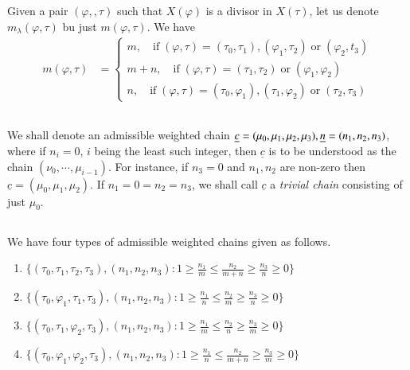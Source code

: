 Given a pair $(\varphi,,\tau)$ such that $X(\varphi)$ is a divisor in $X(\tau)$, let us denote $m_{\lambda}(\varphi, \tau)$ bu just $m(\varphi, \tau)$. We have
\begin{align*}
m(\varphi, \tau) &=
\begin{cases}
m, \quad \text{if}\; (\varphi, \tau) =(\tau_{0}, \tau_{1}), (\varphi_{1}, \tau_{2}) \;\text{or}\; (\varphi_{2}, t_{3})\\
m+n,\quad \text{if}\; (\varphi, \tau) =(\tau_{1}, \tau_{2})\; \text{or} \; (\varphi_{1}, \varphi_{2})\\
n, \quad \text{if} \; (\varphi, \tau) =(\tau_{0}, \varphi_{1}), (\tau_{1}, \varphi_{2})\; \text{or}\; (\tau_{2}, \tau_{3})
\end{cases}
\end{align*}

\subsection{}\label{chap9-subsec-4.4}
We shall denote an admissible weighted chain $\underline{c} =(\mu_{0},\mu_{1}, \mu_{2}, \mu_{3}),\break \underline{n} = (n_{1}, n_{2}, n_{3})$, where if $n_{i} = 0$, $i$ being the least such integer, then $\underline{c}$ is to be understood as the chain $(\nu_{0}, \cdots,\mu_{i-1})$. For instance, if $n_{3}=0$ and $n_{1}, n_{2}$ are non-zero then $\underline{c} = (\mu_{0}, \mu_{1},\mu_{2})$. If $n_{1}=0 =n_{2} =n_{3}$, we shall call $\underline{c}$ a \textit{trivial chain} consisting of just $\mu_{0}$.  

\subsection{}\label{chap9-subsec-4.5}
We have four types of admissible weighted chains given as follows.
\begin{enumerate}[Type I:]
\item $\{(\tau_{0}, \tau_{1}, \tau_{2}, \tau_{3}), (n_{1}, n_{2}, n_{3}) : 1 \geq \frac{n_{1}}{m} \leq \frac{n_{2}}{m+n}   \geq \frac{n_{3}}{n}\geq 0\}$\label{chap9-subsec4.5-I}

\item $\{(\tau_{0}, \varphi_{1}, \tau_{1}, \tau_{3}), (n_{1}, n_{2}, n_{3}) : 1 \geq \frac{n_{1}}{n} \leq \frac{n_{2}}{m} \geq \frac{n_{3}}{n} \geq 0\}$\label{chap9-subsec4.5-II}

\item $\{(\tau_{0}, \tau_{1}, \varphi_{2}, \tau_{3}), (n_{1}, n_{2}, n_{3}) : 1 \geq \frac{n_{1}}{m} \leq \frac{n_{2}}{n} \geq \frac{n_{3}}{m} \geq 0\}$\label{chap9-subsec4.5-III}

\item $\{(\tau_{0}, \varphi_{1}, \varphi_{2}, \tau_{3}), (n_{1}, n_{2}, n_{3}) : 1 \geq \frac{n_{1}}{n} \leq \frac{n_{2}}{m+n} \geq \frac{n_{3}}{m} \geq 0\}$\label{chap9-subsec4.5-IV}
\end{enumerate}

